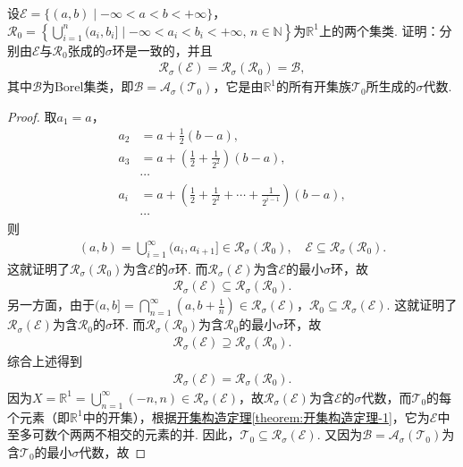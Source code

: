 \documentclass[../../main.tex]{subfiles}%
\begin{document}
\begin{example}
设$\mathscr{E}=\{(a,b)\mid -\infty<a<b<+\infty\}$，$\mathscr{R}_0=\left\{\bigcup_{i=1}^{n}(a_i,b_i]\mid -\infty<a_i<b_i<+\infty,\,n\in\mathbb{N}\right\}$为$\mathbb{R}^1$上的两个集类. 证明：分别由$\mathscr{E}$与$\mathscr{R}_0$张成的$\sigma$环是一致的，并且
\begin{align*}
\mathscr{R}_\sigma(\mathscr{E})=\mathscr{R}_\sigma(\mathscr{R}_0)=\mathscr{B},
\end{align*}
其中$\mathscr{B}$为Borel集类，即$\mathscr{B}=\mathscr{A}_\sigma(\mathscr{T}_0)$，它是由$\mathbb{R}^1$的所有开集族$\mathscr{T}_0$所生成的$\sigma$代数.
\end{example}
\begin{proof}

取$a_1=a$，
\begin{align*}
a_2&=a+\frac{1}{2}(b-a), \\
a_3&=a+\left(\frac{1}{2}+\frac{1}{2^2}\right)(b-a), \\
&\cdots \\
a_i&=a+\left(\frac{1}{2}+\frac{1}{2^2}+\cdots+\frac{1}{2^{i-1}}\right)(b-a), \\
&\cdots
\end{align*}
则
\begin{align*}
(a,b)=\bigcup_{i=1}^{\infty}(a_i,a_{i+1}]\in\mathscr{R}_\sigma(\mathscr{R}_0),\quad \mathscr{E}\subseteq\mathscr{R}_\sigma(\mathscr{R}_0).
\end{align*}
这就证明了$\mathscr{R}_\sigma(\mathscr{R}_0)$为含$\mathscr{E}$的$\sigma$环. 而$\mathscr{R}_\sigma(\mathscr{E})$为含$\mathscr{E}$的最小$\sigma$环，故
\begin{align*}
\mathscr{R}_\sigma(\mathscr{E})\subseteq\mathscr{R}_\sigma(\mathscr{R}_0).
\end{align*}
另一方面，由于$(a,b]=\bigcap_{n=1}^{\infty}\left(a,b+\frac{1}{n}\right)\in\mathscr{R}_\sigma(\mathscr{E})$，$\mathscr{R}_0\subseteq\mathscr{R}_\sigma(\mathscr{E})$. 这就证明了$\mathscr{R}_\sigma(\mathscr{E})$为含$\mathscr{R}_0$的$\sigma$环. 而$\mathscr{R}_\sigma(\mathscr{R}_0)$为含$\mathscr{R}_0$的最小$\sigma$环，故
\begin{align*}
\mathscr{R}_\sigma(\mathscr{E})\supseteq\mathscr{R}_\sigma(\mathscr{R}_0).
\end{align*}
综合上述得到
\begin{align*}
\mathscr{R}_\sigma(\mathscr{E})=\mathscr{R}_\sigma(\mathscr{R}_0).
\end{align*}
因为$X=\mathbb{R}^1=\bigcup_{n=1}^{\infty}(-n,n)\in\mathscr{R}_\sigma(\mathscr{E})$，故$\mathscr{R}_\sigma(\mathscr{E})$为含$\mathscr{E}$的$\sigma$代数，而$\mathscr{T}_0$的每个元素（即$\mathbb{R}^1$中的开集），根据\hyperref[theorem:开集构造定理-1]{开集构造定理\ref{theorem:开集构造定理-1}}，它为$\mathscr{E}$中至多可数个两两不相交的元素的并. 因此，$\mathscr{T}_0\subseteq\mathscr{R}_\sigma(\mathscr{E})$. 又因为$\mathscr{B}=\mathscr{A}_\sigma(\mathscr{T}_0)$为含$\mathscr{T}_0$的最小$\sigma$代数，故

\end{proof}
\end{document}
